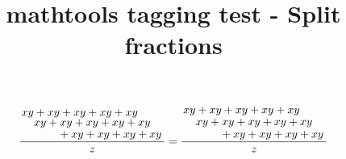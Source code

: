\documentclass{article}
\title{mathtools tagging test - Split fractions}
\begin{document}
\[
\frac{
\splitfrac{xy + xy + xy + xy + xy}
{
\splitfrac{xy + xy + xy + xy + xy}
{+ xy + xy + xy + xy}
}
}
{z}
=\frac{
\splitfrac{xy + xy + xy + xy + xy}
{
\splitfrac{\mathstrut xy + xy + xy + xy + xy}
{+ xy + xy + xy + xy}
}
}
{z}
\]
\end{document}
